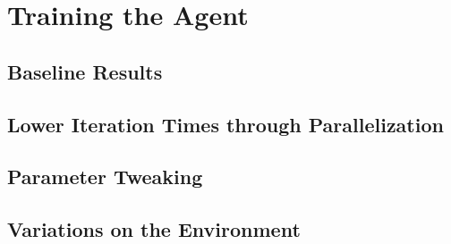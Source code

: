 \chapter{Training the Agent}\label{chap:training}
\section{Baseline Results}\label{sec:tr:baseline_results}
\section{Lower Iteration Times through Parallelization}\label{sec:tr:parallel}
\section{Parameter Tweaking}\label{sec:tr:param_tweaking}
\section{Variations on the Environment}\label{sec:tr:variations}
